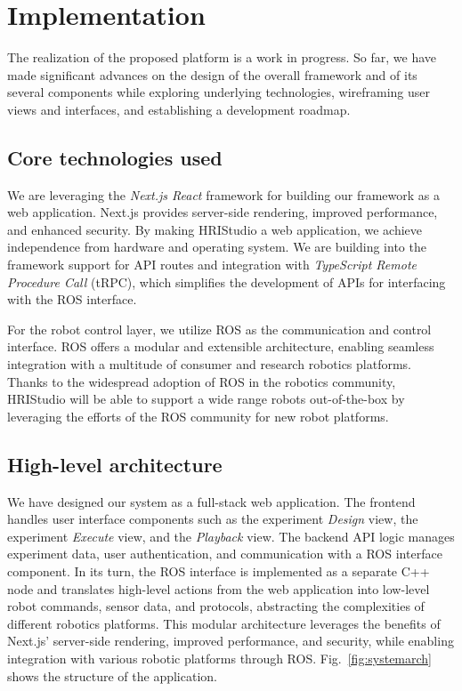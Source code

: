 \documentclass[letterpaper, 10 pt, conference]{ieeeconf}
\begin{document}
\section{Implementation}

The realization of the proposed platform is a work in progress. So far, we have made significant advances on the design of the overall framework and of its several components while exploring underlying technologies, wireframing user views and interfaces, and establishing a development roadmap.

\subsection{Core technologies used}

We are leveraging the \emph{Next.js React} \cite{next} framework for building our framework as a web application. Next.js provides server-side rendering, improved performance, and enhanced security. By making HRIStudio a web application, we achieve independence from hardware and operating system. We are building into the framework support for API routes and integration with \emph{TypeScript Remote Procedure Call} (tRPC), which simplifies the development of APIs for interfacing with the ROS interface.

For the robot control layer, we utilize ROS as the communication and control interface. ROS offers a modular and extensible architecture, enabling seamless integration with a multitude of consumer and research robotics platforms. Thanks to the widespread adoption of ROS in the robotics community, HRIStudio will be able to support a wide range robots out-of-the-box by leveraging the  efforts of the ROS community for new robot platforms.
\vspace{-0.3cm}
\subsection{High-level architecture}

We have designed our system as a full-stack web application. The frontend handles user interface components such as the experiment \emph{Design} view, the experiment \emph{Execute} view, and the \emph{Playback} view. The backend API logic manages experiment data, user authentication, and communication with a ROS interface component. In its turn, the ROS interface is implemented as a separate C++ node and translates high-level actions from the web application into low-level robot commands, sensor data, and protocols, abstracting the complexities of different robotics platforms. This modular architecture leverages the benefits of Next.js' server-side rendering, improved performance, and security, while enabling integration with various robotic platforms through ROS. Fig.~\ref{fig:systemarch} shows the structure of the application.
\end{document}
